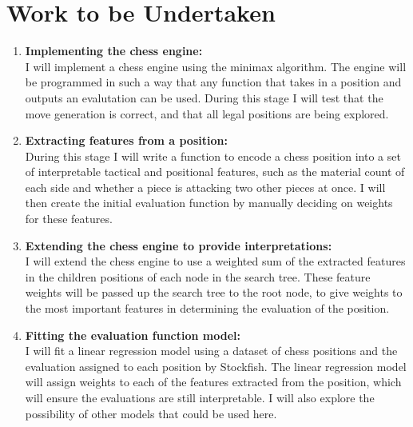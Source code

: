 \documentclass[12pt,a4paper]{article}
\begin{document}
\section*{Work to be Undertaken}
\begin{enumerate}
    \item \textbf{Implementing the chess engine:}
    \\I will implement a chess engine using the minimax algorithm. The engine will be programmed in such a way that any function that takes in a position and outputs an evalutation can be used. During this stage I will test that the move generation is correct, and that all legal positions are being explored.

    \item \textbf{Extracting features from a position:}
    \\During this stage I will write a function to encode a chess position into a set of interpretable tactical and positional features, such as the material count of each side and whether a piece is attacking two other pieces at once. I will then create the initial evaluation function by manually deciding on weights for these features.

    \item \textbf{Extending the chess engine to provide interpretations:}
    \\I will extend the chess engine to use a weighted sum of the extracted features in the children positions of each node in the search tree. These feature weights will be passed up the search tree to the root node, to give weights to the most important features in determining the evaluation of the position.

    \item \textbf{Fitting the evaluation function model:}
    \\I will fit a linear regression model using a dataset of chess positions and the evaluation assigned to each position by Stockfish. The linear regression model will assign weights to each of the features extracted from the position, which will ensure the evaluations are still interpretable. I will also explore the possibility of other models that could be used here.


\end{enumerate}
\end{document}
